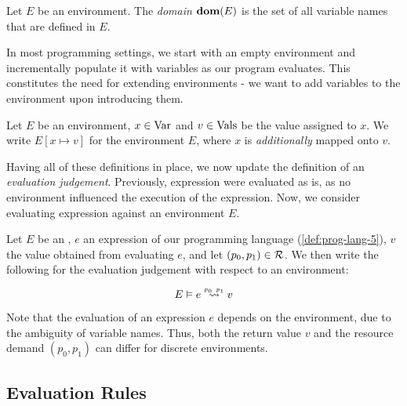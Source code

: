 \begin{definition}
   Let \(E\) be an environment. The \emph{domain} \(\textbf{dom}(E)\) is the set of all variable names that are defined in \(E\).
\end{definition}

In most programming settings, we start with an empty environment and incrementally populate it with variables as our program evaluates. This constitutes the need for extending environments - we want to add variables to the environment upon introducing them.

\begin{definition}\label{def:environment-augment}	
   Let \(E\) be an environment, \(x \in \text{Var}\) and \(v \in \text{Vals}\) be the value assigned to \(x\). We write \(E[x \mapsto v]\) for the environment \(E\), where \(x\) is \emph{additionally} mapped onto \(v\).
\end{definition}

Having all of these definitions in place, we now update the definition of an \emph{evaluation judgement}. Previously, expression were evaluated as is, as no environment influenced the execution of the expression. Now, we consider evaluating expression against an environment \(E\).

\begin{definition}\label{def:eval-judgement-environments}
   Let \(E\) be an , \(e\) an expression of our programming language (\cref{def:prog-lang-5}), \(v\) the value obtained from evaluating \(e\), and let \((p_0, p_1) \in \mathcal{R}\). We then write the following for the evaluation judgement with respect to an environment:

   \[
      \evals{E}{e}{v}{p_0}{p_1}
   \]
	
\end{definition}

\begin{remark}
   Note that the evaluation of an expression \(e\) depends on the environment, due to the ambiguity of variable names. Thus, both the return value \(v\) and the resource demand \((p_0, p_1)\) can differ for discrete environments. 
\end{remark}

\subsection{Evaluation Rules}\label{sec:evaluation-rules-var-tick}

